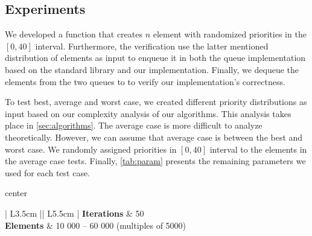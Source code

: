 \documentclass[a4paper,11pt]{kth-mag}
\newcommand*{\skippara}{\par\vspace{\baselineskip} \noindent}
\begin{document}
\subsection{Experiments}
We developed a function that creates $n$ element with randomized priorities in the $[0,40]$ interval.
Furthermore, the verification use the latter mentioned distribution of elements as input to enqueue it in both the queue implementation based on the standard library and our implementation.
Finally, we dequeue the elements from the two queues to to verify our implementation's correctness.

\skippara To test best, average and worst case, we created different priority distributions as input based on our complexity analysis of our algorithms.
This analysis takes place in \cref{sec:algorithms}.
The average case is more difficult to analyze theoretically.
However, we can assume that average case is between the best and worst case.
We randomly assigned priorities in $[0,40]$ interval to the elements in the average case tests.
Finally, \cref{tab:param} presents the remaining parameters we used for each test case.

\begin{table}
    \small
    \caption{Experiment parameters for each implementation and test case}
    \label{tab:param}
    \begin{adjustbox}{center}
        \renewcommand*\arraystretch{1.2}\begin{tabular}{| L{3.5cm} || L{5.5cm} |}
            \hline
            \textbf{Iterations} & 50
            \\ \hline
            \textbf{Elements} & 10 000 -- 60 000 (multiples of 5000)
            \\ \hline
        \end{tabular}
    \end{adjustbox}
\end{table}
\end{document}
